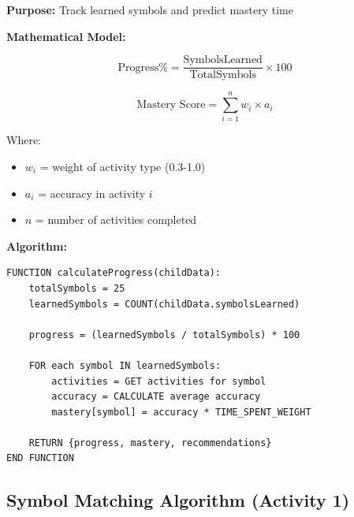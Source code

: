 \documentclass[12pt, a4paper]{article}
\begin{document}
\begin{tcolorbox}[colback=stargold!5, colframe=stargold, title=\textbf{Progress Calculation and Prediction}]

\textbf{Purpose:} Track learned symbols and predict mastery time

\textbf{Mathematical Model:}

\begin{equation}
\text{Progress\%} = \frac{\text{SymbolsLearned}}{\text{TotalSymbols}} \times 100
\end{equation}

\begin{equation}
\text{Mastery Score} = \sum_{i=1}^{n} w_i \times a_i
\end{equation}

Where:
\begin{itemize}
    \item $w_i$ = weight of activity type (0.3-1.0)
    \item $a_i$ = accuracy in activity $i$
    \item $n$ = number of activities completed
\end{itemize}

\textbf{Algorithm:}
\begin{verbatim}
FUNCTION calculateProgress(childData):
    totalSymbols = 25
    learnedSymbols = COUNT(childData.symbolsLearned)
    
    progress = (learnedSymbols / totalSymbols) * 100
    
    FOR each symbol IN learnedSymbols:
        activities = GET activities for symbol
        accuracy = CALCULATE average accuracy
        mastery[symbol] = accuracy * TIME_SPENT_WEIGHT
    
    RETURN {progress, mastery, recommendations}
END FUNCTION
\end{verbatim}

\end{tcolorbox}

\subsection{Symbol Matching Algorithm (Activity 1)}
\end{document}

